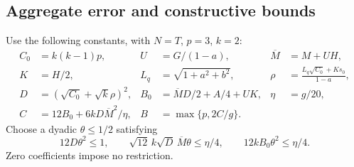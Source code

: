 \subsection{Aggregate error and constructive bounds}

Use the following constants, with $N=T$, $p=3$, $k=2$:
\begin{equation}\label{eq:dynamics-constants}
 \begin{aligned}
 C_0&=k(k-1)p,& U&=G/(1-a),&\overline M&=M+UH,\\
 K&=H/2,&L_q&=\sqrt{1+a^2+b^2},&
 \rho&=\frac{L_q\sqrt{C_0}+Ks_0}{1-a},\\
 D&=(\sqrt{C_0}+\sqrt{k}\rho)^2,&
 B_0&=\overline M D/2+A/4+UK,&\eta&=g/20,\\
 C&=12B_0+6kD\overline M^2/\eta,&
 B&=\max\{p,2C/g\}.&&
 \end{aligned}
\end{equation}
Choose a dyadic $\theta\le1/2$ satisfying
\begin{equation}\label{eq:dynamics-grading}
 12D\theta^2\le1,\qquad
 \sqrt{12}\,k\sqrt D\,\overline M\theta\le\eta/4,\qquad
 12kB_0\theta^2\le\eta/4.
\end{equation}
Zero coefficients impose no restriction.

